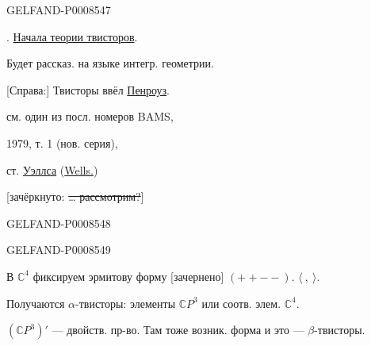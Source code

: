 \begin{GelfandAdjacentEvidence}{GELFAND-P000854}{7}


\medskip
{}. \uline{Начала теории твисторов}.

Будет рассказ. на языке интегр. геометрии.

[Справа:] Твисторы ввёл \uline{Пенроуз}.

см. один из посл. номеров BAMS,

1979, т. 1 (нов. серия),

ст. \uline{Уэллса} (\uline{Wells.})

[зачёркнуто: \sout{… рассмотрим?}]
\end{GelfandAdjacentEvidence}
\begin{GelfandAdjacentEvidence}{GELFAND-P000854}{8}


\end{GelfandAdjacentEvidence}
\begin{GelfandAdjacentEvidence}{GELFAND-P000854}{9}


В \(\mathbb{C}^4\) фиксируем эрмитову форму [зачернено] \((++--)\). \(\langle\ ,\ \rangle\).
\end{GelfandAdjacentEvidence}


Получаются \(\alpha\)-твисторы: элементы \(\mathbb{C}P^3\) или соотв. элем. \(\mathbb{C}^4\).

\((\mathbb{C}P^3)'\) — двойств. пр-во. Там тоже возник. форма и это — \(\beta\)-твисторы.


